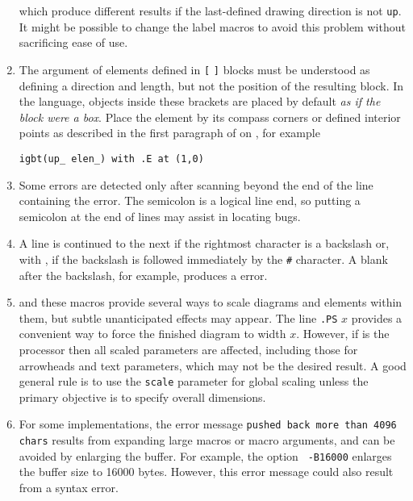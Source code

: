 \begin{enumerate}
\noindent%
which produce different results if the last-defined drawing direction is not
{\tt up}.  It might be possible to change the label macros to avoid this problem
without sacrificing ease of use.

\item
{}
  The \linespec argument of elements defined in {\tt[} {\tt]}
  blocks must be understood as defining a direction and length, but
  not the position of the resulting block.
  In the \pic language, objects inside these brackets are placed by
  default {\em as if the block were a box}.  Place the
  element by its compass corners or defined interior points
  as described in the first paragraph of  on
  , for example  
  
{\tt igbt(up\_ elen\_) with .E at (1,0)}

\item
{}
 Some errors are detected only after scanning
  beyond the end of the line containing the error.  The semicolon
  is a logical line end, so putting a semicolon at the end of lines may
  assist in locating bugs. 

\item
{}
 A line is continued to the next if the
  rightmost character is a backslash or, with \dpic, if the backslash is
  followed immediately by the {\tt \#} character.
  A blank after the backslash, for example, produces a \pic error.

\item
{}
 \Pic and these macros provide several ways to scale
  diagrams and elements within them, but subtle unanticipated effects
  may appear.  The line {\tt.PS} $x$ provides a convenient way to force
  the finished diagram to width $x.$  However, if \gpic is the
  \pic processor then all scaled parameters are affected, including those
  for arrowheads and text parameters, which may not be the desired
  result.  A good general rule is to use the {\tt scale} parameter for
  global scaling unless the primary objective is to specify overall
  dimensions.

\item
{}
 For some \Mfour implementations,
  the error message {\tt pushed back more than 4096 chars}
  results from expanding large macros or macro arguments, and can be
  avoided by enlarging the buffer.  For example, the option {\tt
  -B16000} enlarges the buffer size to 16000 bytes.  However, this
  error message could also result from a syntax error.


\end{enumerate}
